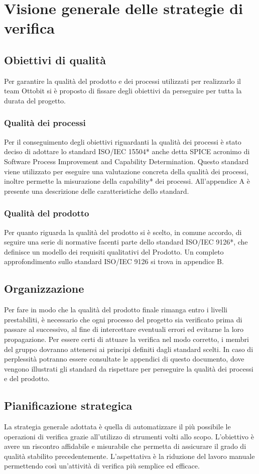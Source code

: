 \section{Visione generale delle strategie di verifica}
\subsection{Obiettivi di qualità}
	Per garantire la qualità del prodotto e dei processi utilizzati per realizzarlo il team Ottobit si è proposto di fissare degli obiettivi da perseguire per tutta la durata del progetto.
	\subsubsection{Qualità dei processi}
	Per il conseguimento degli obiettivi riguardanti la qualità dei processi è stato deciso di adottare lo standard ISO/IEC 15504* anche detta SPICE acronimo di Software Process Improvement and Capability Determination. Questo standard viene utilizzato per eseguire una valutazione concreta della qualità dei processi, inoltre permette la misurazione della capability* dei processi. All'appendice A è presente una descrizione delle caratteristiche dello standard.
	\subsubsection{Qualità del prodotto}
		Per quanto riguarda la qualità del prodotto si è scelto, in comune accordo, di seguire una serie di normative facenti parte dello standard ISO/IEC 9126*, che definisce un modello dei requisiti qualitativi del Prodotto. Un completo approfondimento sullo standard ISO/IEC 9126 si trova in appendice B.
\subsection{Organizzazione}
Per fare in modo che la qualità del prodotto finale rimanga entro i livelli prestabiliti, è necessario che ogni processo del progetto sia verificato prima di passare al successivo, al fine di intercettare eventuali errori ed evitarne la loro propagazione. Per essere certi di attuare la verifica nel modo corretto, i membri del gruppo dovranno attenersi ai principi definiti dagli standard scelti. In caso di perplessità potranno essere consultate le appendici di questo documento, dove vengono illustrati gli standard da rispettare per perseguire la qualità dei processi e del prodotto.

\subsection{Pianificazione strategica}
La strategia generale adottata è quella di automatizzare il più possibile le operazioni di verifica grazie all'utilizzo di strumenti volti allo scopo. L'obiettivo è avere un riscontro affidabile e misurabile che permetta di assicurare il grado di qualità stabilito precedentemente.  L'aspettativa è la riduzione del lavoro manuale permettendo così un'attività di verifica più semplice ed efficace.

